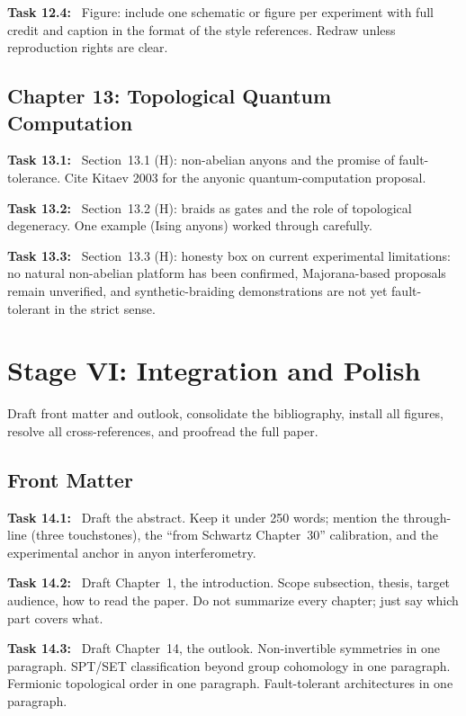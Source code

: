 \documentclass[11pt]{article}
\newcommand{\task}[1]{\medskip\noindent\textbf{Task #1:}\ }
\begin{document}
\task{12.4} Figure: include one schematic or figure per experiment with full credit and
caption in the format of the style references. Redraw unless reproduction rights are clear.

\subsection{Chapter 13: Topological Quantum Computation}

\task{13.1} Section~13.1 (H): non-abelian anyons and the promise of fault-tolerance.
Cite Kitaev 2003 for the anyonic quantum-computation proposal.

\task{13.2} Section~13.2 (H): braids as gates and the role of topological degeneracy.
One example (Ising anyons) worked through carefully.

\task{13.3} Section~13.3 (H): honesty box on current experimental limitations: no
natural non-abelian platform has been confirmed, Majorana-based proposals remain unverified,
and synthetic-braiding demonstrations are not yet fault-tolerant in the strict sense.

\section{Stage VI: Integration and Polish}\label{sec:stageVI}

\begin{goalbox}[Objective]
Draft front matter and outlook, consolidate the bibliography, install all figures,
resolve all cross-references, and proofread the full paper.
\end{goalbox}

\subsection{Front Matter}

\task{14.1} Draft the abstract. Keep it under 250 words; mention the through-line
(three touchstones), the ``from Schwartz Chapter~30'' calibration, and the experimental
anchor in anyon interferometry.

\task{14.2} Draft Chapter~1, the introduction. Scope subsection, thesis, target audience,
how to read the paper. Do not summarize every chapter; just say which part covers what.

\task{14.3} Draft Chapter~14, the outlook. Non-invertible symmetries in one paragraph.
SPT/SET classification beyond group cohomology in one paragraph. Fermionic topological
order in one paragraph. Fault-tolerant architectures in one paragraph.
\end{document}
